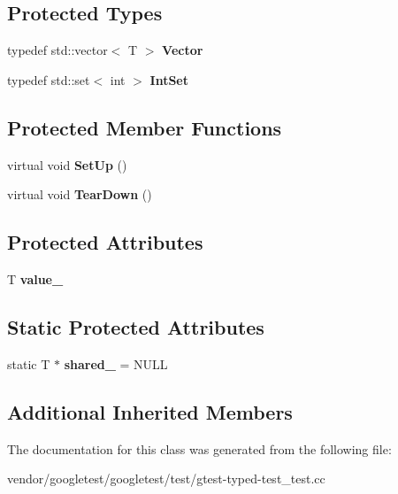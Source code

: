 \subsection*{Protected Types}
\begin{DoxyCompactItemize}
\item 
\mbox{\label{class_common_test_a6dfdcede6964887b9f4254a0e0478e37}} 
typedef std\+::vector$<$ T $>$ {\bfseries Vector}
\item 
\mbox{\label{class_common_test_a62827e9d3064cddf4a8698747f1bd434}} 
typedef std\+::set$<$ int $>$ {\bfseries Int\+Set}
\end{DoxyCompactItemize}
\subsection*{Protected Member Functions}
\begin{DoxyCompactItemize}
\item 
\mbox{\label{class_common_test_a4c7bf7889ce48a9d06530bc4a437f3f5}} 
virtual void {\bfseries Set\+Up} ()
\item 
\mbox{\label{class_common_test_aeae195c2cefa956c6ae5be1226e6ecd8}} 
virtual void {\bfseries Tear\+Down} ()
\end{DoxyCompactItemize}
\subsection*{Protected Attributes}
\begin{DoxyCompactItemize}
\item 
\mbox{\label{class_common_test_ae59c4abcb833625a7baeb2048531ebec}} 
T {\bfseries value\+\_\+}
\end{DoxyCompactItemize}
\subsection*{Static Protected Attributes}
\begin{DoxyCompactItemize}
\item 
\mbox{\label{class_common_test_a52368ce1e65a865db9bdccbcc2cedaac}} 
static T $\ast$ {\bfseries shared\+\_\+} = N\+U\+LL
\end{DoxyCompactItemize}
\subsection*{Additional Inherited Members}


The documentation for this class was generated from the following file\+:\begin{DoxyCompactItemize}
\item 
vendor/googletest/googletest/test/gtest-\/typed-\/test\+\_\+test.\+cc\end{DoxyCompactItemize}
